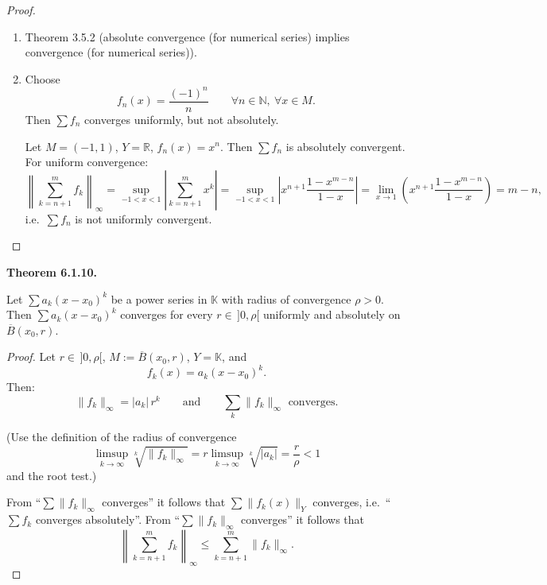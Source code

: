 \documentclass[12pt]{article}
\newenvironment{satz}[1]{%
  \par\vspace{6pt}\noindent\textbf{Theorem #1.}\itshape\space
}{%
  \par\vspace{6pt}
}
\begin{document}
\begin{proof}
\begin{enumerate}
    \item Theorem 3.5.2 (absolute convergence (for numerical series) implies convergence (for numerical series)).
    \item Choose
    \[
    f_n(x)=\frac{(-1)^n}{n}
    \qquad \forall n\in\mathbb N,\ \forall x\in M.
    \]
    Then $\sum f_n$ converges uniformly, but not absolutely.

    Let $M=(-1,1)$, $Y=\mathbb R$, $f_n(x)=x^n$. Then $\sum f_n$ is absolutely convergent.
    For uniform convergence:
    \[
    \left\|\sum_{k=n+1}^{m} f_k\right\|_\infty
    =\sup_{-1<x<1}\left|\sum_{k=n+1}^{m}x^k\right|
    =\sup_{-1<x<1}\left|x^{n+1}\frac{1-x^{m-n}}{1-x}\right|
    =\lim_{x\to1}\left(x^{n+1}\frac{1-x^{m-n}}{1-x}\right)
    =m-n,
    \]
    i.e.\ $\sum f_n$ is not uniformly convergent.
\end{enumerate}
\end{proof}

\begin{satz}{6.1.10}
Let $\sum a_k(x-x_0)^k$ be a power series in $\mathbb K$ with radius of convergence $\rho>0$.
Then $\sum a_k(x-x_0)^k$ converges for every $r\in\,]0,\rho[$ uniformly and absolutely on $\overline{B}(x_0,r)$.
\end{satz}

\begin{proof}
Let $r\in\,]0,\rho[$, $M:=\overline{B}(x_0,r)$, $Y=\mathbb K$, and
\[
f_k(x)=a_k(x-x_0)^k.
\]
Then:
\[
\|f_k\|_\infty=|a_k|\,r^k
\qquad\text{and}\qquad
\sum_k \|f_k\|_\infty \text{ converges.}
\]

(Use the definition of the radius of convergence
\[
\limsup_{k\to\infty}\sqrt[k]{\|f_k\|_\infty}
= r\limsup_{k\to\infty}\sqrt[k]{|a_k|}
= \frac r\rho <1
\]
and the root test.)

From ``$\sum \|f_k\|_\infty$ converges'' it follows that
$\sum \|f_k(x)\|_Y$ converges, i.e.\ ``$\sum f_k$ converges absolutely''.
From ``$\sum \|f_k\|_\infty$ converges'' it follows that
\[
\left\|\sum_{k=n+1}^{m} f_k\right\|_\infty
\le
\sum_{k=n+1}^{m}\|f_k\|_\infty.
\]
\end{proof}
\end{document}
